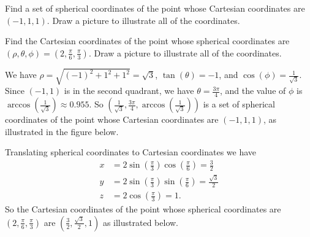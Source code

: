 \begin{activity} \label{A:11.8.6} 
\ba
	\item Find a set of spherical coordinates of the point whose Cartesian coordinates are $(-1, 1, 1)$. Draw a picture to illustrate all of the coordinates.
	
	
	
	\item Find the Cartesian coordinates of the point whose spherical coordinates are $(\rho, \theta, \phi) = \left(2, \frac{\pi}{6}, \frac{\pi}{3}\right)$. Draw a picture to illustrate all of the coordinates.
	
	
	
	\ea

\end{activity}
\begin{smallhint} 

\end{smallhint}
\begin{bighint}

\end{bighint}
\begin{activitySolution}
\ba
	\item We have $\rho = \sqrt{(-1)^2+1^2+1^2} = \sqrt{3}$, $\tan(\theta) = -1$, and $\cos(\phi) = \frac{1}{\sqrt{3}}$. Since $(-1,1)$ is in the second quadrant, we have $\theta = \frac{3\pi}{4}$, and the value of $\phi$ is $\arccos\left(\frac{1}{\sqrt{3}}\right) \approx 0.955$.  So $\left(\frac{1}{\sqrt{3}}, \frac{3\pi}{4}, \arccos\left(\frac{1}{\sqrt{3}}\right)\right)$ is a set of spherical coordinates of the point whose Cartesian coordinates are $(-1, 1, 1)$, as illustrated in the figure below. 
\begin{center}
\end{center}	
	
	
	\item Translating spherical coordinates to Cartesian coordinates we have 
\begin{align*}
x &= 2 \sin\left(\frac{\pi}{3}\right)\cos\left(\frac{\pi}{6}\right) = \frac{3}{2} \\
y &= 2 \sin\left(\frac{\pi}{3}\right)\sin\left(\frac{\pi}{6}\right) = \frac{\sqrt{3}}{2} \\
z &= 2 \cos\left(\frac{\pi}{3}\right) = 1.
\end{align*}
So the Cartesian coordinates of the point whose spherical coordinates are $\left(2, \frac{\pi}{6}, \frac{\pi}{3}\right)$ are $\left(\frac{3}{2}, \frac{\sqrt{3}}{2}, 1\right)$ as illustrated below. 
\begin{center}
\end{center}	
	
	
	
	\ea
\end{activitySolution}
\aftera
